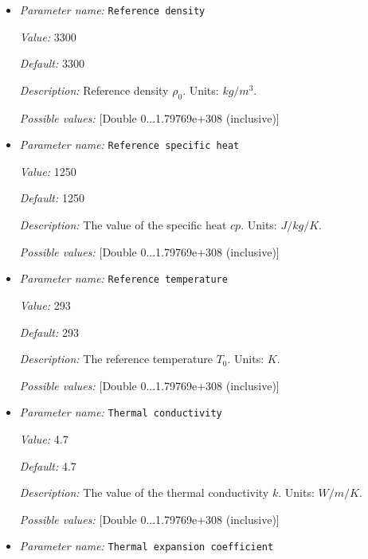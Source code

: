 \begin{itemize}
{\it Possible values:} [Double -1.79769e+308...1.79769e+308 (inclusive)]
\item {\it Parameter name:} {\tt Reference density}
\label{parameters:Material model/Stamps model/Reference density}


{\it Value:} 3300


{\it Default:} 3300


{\it Description:} Reference density $\rho_0$. Units: $kg/m^3$.


{\it Possible values:} [Double 0...1.79769e+308 (inclusive)]
\item {\it Parameter name:} {\tt Reference specific heat}
\label{parameters:Material model/Stamps model/Reference specific heat}


{\it Value:} 1250


{\it Default:} 1250


{\it Description:} The value of the specific heat $cp$. Units: $J/kg/K$.


{\it Possible values:} [Double 0...1.79769e+308 (inclusive)]
\item {\it Parameter name:} {\tt Reference temperature}
\label{parameters:Material model/Stamps model/Reference temperature}


{\it Value:} 293


{\it Default:} 293


{\it Description:} The reference temperature $T_0$. Units: $K$.


{\it Possible values:} [Double 0...1.79769e+308 (inclusive)]
\item {\it Parameter name:} {\tt Thermal conductivity}
\label{parameters:Material model/Stamps model/Thermal conductivity}


{\it Value:} 4.7


{\it Default:} 4.7


{\it Description:} The value of the thermal conductivity $k$. Units: $W/m/K$.


{\it Possible values:} [Double 0...1.79769e+308 (inclusive)]
\item {\it Parameter name:} {\tt Thermal expansion coefficient}
\label{parameters:Material model/Stamps model/Thermal expansion coefficient}



\end{itemize}

